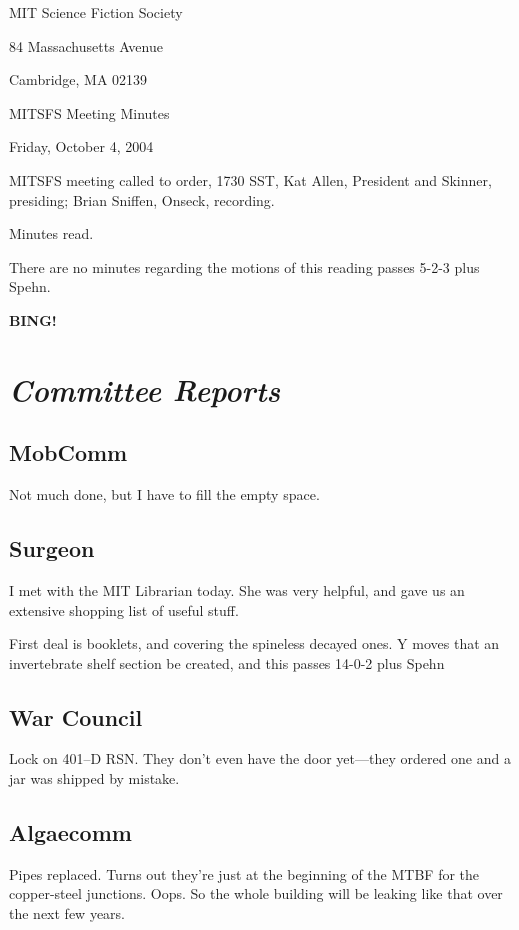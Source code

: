 \documentclass[10pt]{article}
\newcommand{\bing}{{\bf BING!} }
\newcommand{\goto}[1]{\bing \vskip 12pt \section*{{\em{#1}}}}
\newcommand{\ps}{ plus Spehn\xspace}
\begin{document}
\begin{center}

MIT Science Fiction Society

84 Massachusetts Avenue

Cambridge, MA 02139

\vspace{12pt}

MITSFS Meeting Minutes

Friday, October 4, 2004

\end{center}

\vspace{18pt}

\setlength{\parskip}{6pt}

\noindent
MITSFS meeting called to order, 1730 SST, Kat Allen, President and
Skinner, presiding; Brian Sniffen,  Onseck, recording.

Minutes read.

There are no minutes regarding the motions of this reading passes 5-2-3\ps.

\goto{Committee Reports}
\subsection*{MobComm}

Not much done, but I have to fill the empty space.

\subsection*{Surgeon}

I met with the MIT Librarian today.  She was very helpful, and gave us
an extensive shopping list of useful stuff.

First deal is booklets, and covering the spineless decayed ones.  Y
moves that an invertebrate shelf section be created, and this passes
14-0-2\ps

\subsection*{War Council}
Lock on 401--D RSN.  They don't even have the door yet---they ordered
one and a jar was shipped by mistake.

\subsection*{Algaecomm}

Pipes replaced.  Turns out they're just at the beginning of the MTBF
for the copper-steel junctions.  Oops.  So the whole building will be
leaking like that over the next few years.
\end{document}
